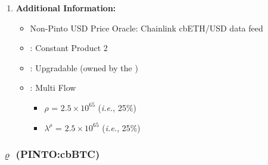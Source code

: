 \documentclass[class=article, crop=false]{standalone}
\begin{document}
\begin{enumerate}
    \item \textbf{Additional Information:}
        \begin{itemize}
            \item Non-Pinto USD Price Oracle: Chainlink cbETH/USD data feed
            \item {}: Constant Product 2
            \item {}: Upgradable  (owned by the )
            \item {}: Multi Flow
                \begin{itemize}
                    \item $\rho$ = $2.5 \times 10^{65}$ (\textit{i.e.}, 25\%)
                    \item $\lambda^{\rho}$ = $2.5 \times 10^{65}$ (\textit{i.e.}, 25\%)
                \end{itemize}
        \end{itemize}

\end{enumerate}


\subsubsection{$\varrho$ (PINTO:cbBTC)}
\end{document}
